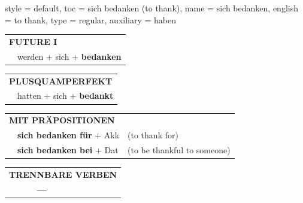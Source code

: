 \begin{verbentry}{
  style = {default},
  toc = {sich bedanken (to thank)},
  name = {sich bedanken},
  english = {to thank},
  type = {regular},
  auxiliary = {haben}
}
\begin{tabular}{rl}
    \multicolumn{2}{l}{\textbf{FUTURE I} }\\
    &werden + sich + \textbf{bedanken}\\
 
  \end{tabular}
\hfill
   \begin{tabular}{rl}
      \multicolumn{2}{l}{\textbf{PLUSQUAMPERFEKT}}\\
    &hatten + sich + \textbf{bedankt}\\
  \end{tabular}
  
\vspace{10pt}

   \begin{tabular}{lll}
      \multicolumn{3}{l}{\textbf{MIT PRÄPOSITIONEN}}\\
& \textbf{sich bedanken für} + Akk & (to thank for)\\
& \textbf{sich bedanken bei} + Dat & (to be thankful to someone)
  \end{tabular}
 \hfill
  \begin{tabular}{lll}
\multicolumn{3}{l}{\textbf{TRENNBARE VERBEN}}\\
& \textbf{---} & \\
\end{tabular}
  
  \vspace{-5pt}
\end{verbentry}

